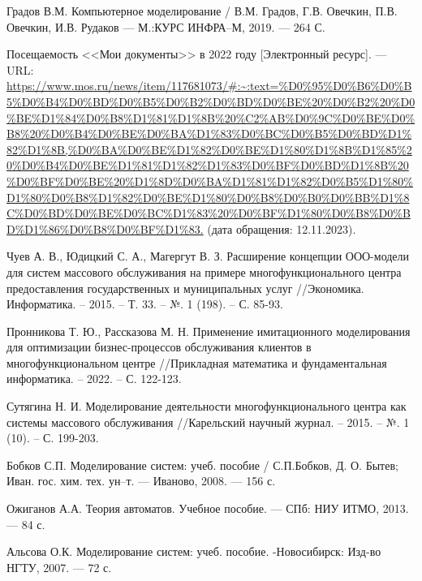 
\renewcommand\bibname{СПИСОК ИСПОЛЬЗОВАННЫХ ИСТОЧНИКОВ}
\begin{thebibliography}{}
	
\setlength\bibindent{1.25cm}
\makeatletter
\let\old@biblabel\@biblabel
\def\@biblabel#1{\kern\bibindent\old@biblabel{#1}}
\makeatother

 Градов В.М. Компьютерное моделирование / В.М. Градов, Г.В. Овечкин, П.В. Овечкин, И.В. Рудаков --- М.:КУРС ИНФРА--М, 2019. --- 264 С. 

 Посещаемость <<Мои документы>> в 2022 году [Электронный ресурс]. --- URL: \url{https://www.mos.ru/news/item/117681073/#:~:text=%D0%95%D0%B6%D0%B5%D0%B4%D0%BD%D0%B5%D0%B2%D0%BD%D0%BE%20%D0%B2%20%D0%BE%D1%84%D0%B8%D1%81%D1%8B%20%C2%AB%D0%9C%D0%BE%D0%B8%20%D0%B4%D0%BE%D0%BA%D1%83%D0%BC%D0%B5%D0%BD%D1%82%D1%8B,%D0%BA%D0%BE%D1%82%D0%BE%D1%80%D1%8B%D1%85%20%D0%B4%D0%BE%D1%81%D1%82%D1%83%D0%BF%D0%BD%D1%8B%20%D0%BF%D0%BE%20%D1%8D%D0%BA%D1%81%D1%82%D0%B5%D1%80%D1%80%D0%B8%D1%82%D0%BE%D1%80%D0%B8%D0%B0%D0%BB%D1%8C%D0%BD%D0%BE%D0%BC%D1%83%20%D0%BF%D1%80%D0%B8%D0%BD%D1%86%D0%B8%D0%BF%D1%83.} (дата обращения: 12.11.2023).

 Чуев А. В., Юдицкий С. А., Магергут В. З. Расширение концепции ООО-модели для систем массового обслуживания на примере многофункционального центра предоставления государственных и муниципальных услуг //Экономика. Информатика. – 2015. – Т. 33. – №. 1 (198). – С. 85-93.

 Пронникова Т. Ю., Рассказова М. Н. Применение имитационного моделирования для оптимизации бизнес-процессов обслуживания клиентов в многофункциональном центре //Прикладная математика и фундаментальная информатика. – 2022. – С. 122-123.

 Сутягина Н. И. Моделирование деятельности многофункционального центра как системы массового обслуживания //Карельский научный журнал. – 2015. – №. 1 (10). – С. 199-203.

 Бобков С.П. Моделирование систем: учеб. пособие / С.П.Бобков, Д. О. Бытев; Иван. гос. хим. тех. ун--т. --- Иваново, 2008. --- 156 с. 

 Ожиганов А.А. Теория автоматов. Учебное пособие. --- СПб: НИУ ИТМО, 2013. --- 84 с. 

 Альсова О.К. Моделирование систем: учеб. пособие. -Новосибирск: Изд-во НГТУ, 2007. --- 72 с.


\end{thebibliography}
